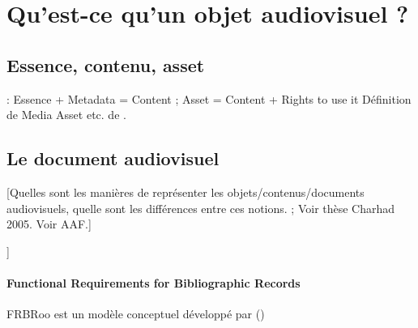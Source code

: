 \section{Qu'est-ce qu'un objet audiovisuel ?}\label{sec:dav}


\subsection{Essence, contenu, asset}
\cite{Cox2006} : Essence + Metadata = Content ; \cite{Austerberry2004} Asset = Content + Rights to use it
Définition de Media Asset etc. de \cite{Furht2008}.

\subsection{Le document audiovisuel}
[Quelles sont les manières de représenter les objets/contenus/documents audiovisuels, quelle sont les différences entre ces notions.
\cite{Morizet-mahoudeaux2005a} ;  Voir thèse Charhad 2005. Voir AAF.]

]

\paragraph{Functional Requirements for Bibliographic Records}
FRBRoo est un modèle conceptuel développé par (\cite{Aalberg2008})

